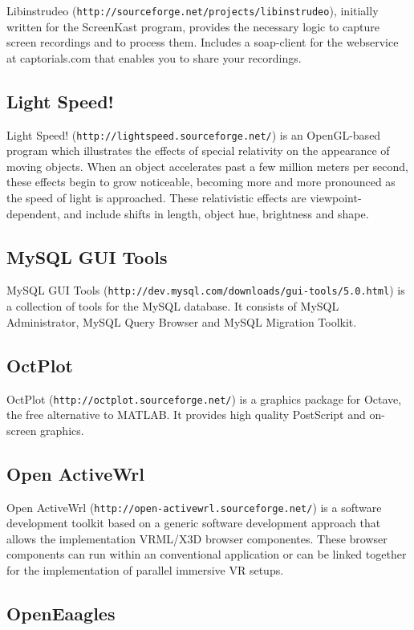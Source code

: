 Libinstrudeo ({\tt http://sourceforge.net/projects/libinstrudeo}), initially written for the ScreenKast program, provides the necessary logic to capture screen recordings and to process them. Includes a soap-client for the webservice at captorials.com that enables you to share your recordings.\subsection{Light Speed!}\label{ftgl-projects_lightspeed}
Light Speed! ({\tt http://lightspeed.sourceforge.net/}) is an OpenGL-based program which illustrates the effects of special relativity on the appearance of moving objects. When an object accelerates past a few million meters per second, these effects begin to grow noticeable, becoming more and more pronounced as the speed of light is approached. These relativistic effects are viewpoint-dependent, and include shifts in length, object hue, brightness and shape.\subsection{MySQL GUI Tools}\label{ftgl-projects_mysqlguitools}
MySQL GUI Tools ({\tt http://dev.mysql.com/downloads/gui-tools/5.0.html}) is a collection of tools for the MySQL database. It consists of MySQL Administrator, MySQL Query Browser and MySQL Migration Toolkit.\subsection{OctPlot}\label{ftgl-projects_octplot}
OctPlot ({\tt http://octplot.sourceforge.net/}) is a graphics package for Octave, the free alternative to MATLAB. It provides high quality PostScript and on-screen graphics.\subsection{Open ActiveWrl}\label{ftgl-projects_openactivewrl}
Open ActiveWrl ({\tt http://open-activewrl.sourceforge.net/}) is a software development toolkit based on a generic software development approach that allows the implementation VRML/X3D browser componentes. These browser components can run within an conventional application or can be linked together for the implementation of parallel immersive VR setups.\subsection{OpenEaagles}\label{ftgl-projects_openeaagles}
